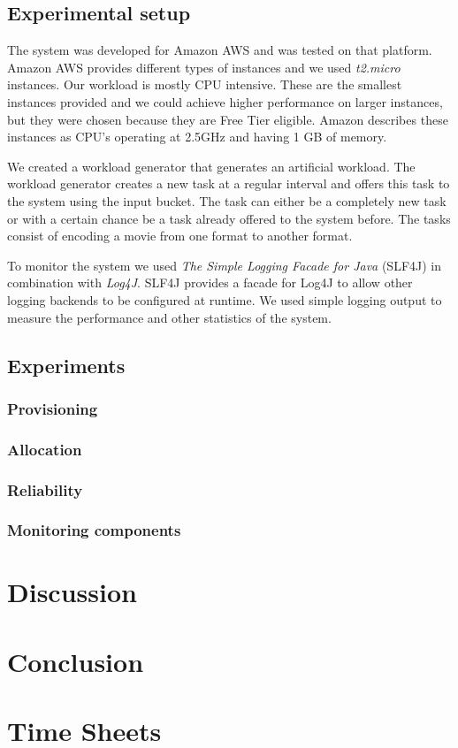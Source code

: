 \documentclass[a4paper]{IEEEtran}
\begin{document}
\subsection{Experimental setup}
The system was developed for Amazon AWS and was tested on that platform.
Amazon AWS provides different types of instances and we used \emph{t2.micro} instances.
Our workload is mostly CPU intensive.
These are the smallest instances provided and we could achieve higher performance on larger instances,
 but they were chosen because they are Free Tier eligible.
Amazon describes these instances as CPU's operating at 2.5GHz and having 1 GB of memory.

We created a workload generator that generates an artificial workload.
The workload generator creates a new task at a regular interval and offers this task to the system using the input bucket.
The task can either be a completely new task or with a certain chance be a task already offered to the system before.
The tasks consist of encoding a movie from one format to another format.

To monitor the system we used \emph{The Simple Logging Facade for Java} (SLF4J) in combination with \emph{Log4J}.
SLF4J provides a facade for Log4J to allow other logging backends to be configured at runtime.
We used simple logging output to measure the performance and other statistics of the system.

\subsection{Experiments}
\subsubsection{Provisioning}

\subsubsection{Allocation}

\subsubsection{Reliability}

\subsubsection{Monitoring components}


\section{Discussion}

\section{Conclusion}

\appendix
\section{Time Sheets}
\end{document}
